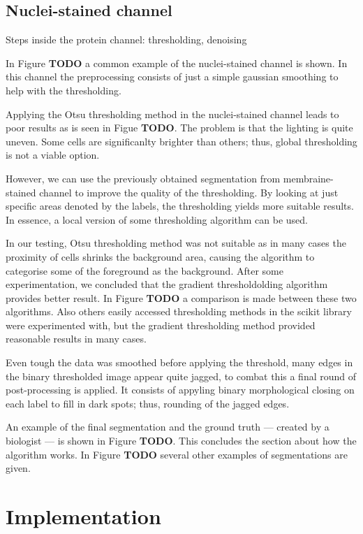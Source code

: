 \documentclass[
  digital,     %
  oneside,     %
  nosansbold,  %
  nocolorbold, %
  lof,         %
  lot,         %
]{fithesis4}
\begin{document}
\section{Nuclei-stained channel}

Steps inside the protein channel: thresholding, denoising

In Figure \textbf{TODO} a common example of the nuclei-stained channel is shown.
In this channel the preprocessing consists of just a simple gaussian smoothing
to help with the thresholding.

Applying the Otsu thresholding method in the nuclei-stained channel leads to
poor results as is seen in Figue \textbf{TODO}. The problem is that the lighting
is quite uneven. Some cells are significanlty brighter than others; thus, global
thresholding is not a viable option.

However, we can use the previously obtained segmentation from membraine-stained
channel to improve the quality of the thresholding. By looking at just specific
areas denoted by the labels, the thresholding yields more suitable results. In
essence, a local version of some thresholding algorithm can be used.

In our testing, Otsu thresholding method was not suitable as in many cases the
proximity of cells shrinks the background area, causing the algorithm to
categorise some of the foreground as the background. After some experimentation,
we concluded that the gradient thresholdolding algorithm provides better result.
In Figure \textbf{TODO} a comparison is made between these two algorithms. Also
others easily accessed thresholding methods in the scikit library were
experimented with, but the gradient thresholding method provided reasonable
results in many cases.

Even tough the data was smoothed before applying the threshold, many edges in
the binary thresholded image appear quite jagged, to combat this a final round
of post-processing is applied. It consists of appyling binary morphological
closing on each label to fill in dark spots; thus, rounding of the jagged edges.

An example of the final segmentation and the ground truth --- created by a
biologist --- is shown in Figure \textbf{TODO}. This concludes the section about
how the algorithm works. In Figure \textbf{TODO} several other examples of
segmentations are given.

\chapter{Implementation}
\end{document}
